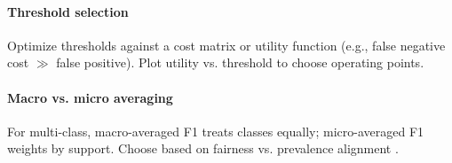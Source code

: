 \paragraph{Threshold selection} Optimize thresholds against a cost matrix or utility function (e.g., false negative cost \(\gg\) false positive). Plot utility vs. threshold to choose operating points.

\paragraph{Macro vs. micro averaging} For multi-class, macro-averaged F1 treats classes equally; micro-averaged F1 weights by support. Choose based on fairness vs. prevalence alignment \textcite{Prince2023}.

